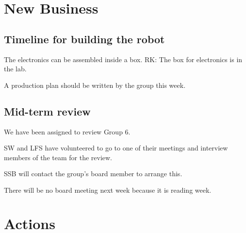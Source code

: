 \documentclass[a4paper,11pt,twoside,class=meetingmins,crop=false]{standalone}
\begin{document}
\section{New Business}
\begin{items}
    \subsection{Timeline for building the robot}
        \item The electronics can be assembled inside a box. RK: The box for electronics is in the lab.
        \item A production plan should be written by the group this week.
    \subsection{Mid-term review}
        \item We have been assigned to review Group 6.
        \item SW and LFS have volunteered to go to one of their meetings and interview members of the team for the review.
        \item SSB will contact the group's board member to arrange this.
\end{items}

\vspace{1em}
There will be no board meeting next week because it is reading week.
\vspace{1em}

\section{Actions}
\begin{items}
\end{items}
\end{document}
